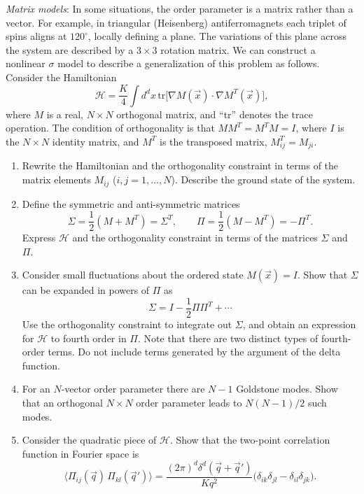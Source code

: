 \begin{problem}
    \textit{Matrix models}: In some situations, the order parameter is a matrix rather than a vector. For example, in triangular (Heisenberg) antiferromagnets each triplet of spins aligns at $120^\circ$, locally defining a plane. The variations of this plane across the system are described by a $3\times 3$ rotation matrix. We can construct a nonlinear $\sigma$ model to describe a generalization of this problem as follows. Consider the Hamiltonian
    \[
        \mathcal{H} = \frac{K}{4}\int d^dx\,\mathrm{tr}\bigl[\nabla M(\vec{x})\cdot\nabla M^T(\vec{x})\bigr],
    \]
    where $M$ is a real, $N\times N$ orthogonal matrix, and ``tr'' denotes the trace operation. The condition of orthogonality is that $MM^T = M^TM = I$, where $I$ is the $N\times N$ identity matrix, and $M^T$ is the transposed matrix, $M^T_{ij} = M_{ji}$.

    \begin{enumerate}
        \item[(a)] Rewrite the Hamiltonian and the orthogonality constraint in terms of the matrix elements $M_{ij}$ ($i,j = 1, \ldots, N$). Describe the ground state of the system.

        \item[(b)] Define the symmetric and anti-symmetric matrices
        \[
            \Sigma = \frac{1}{2}(M + M^T) = \Sigma^T, \qquad \Pi = \frac{1}{2}(M - M^T) = -\Pi^T.
        \]
        Express $\mathcal{H}$ and the orthogonality constraint in terms of the matrices $\Sigma$ and $\Pi$.

        \item[(c)] Consider small fluctuations about the ordered state $M(\vec{x}) = I$. Show that $\Sigma$ can be expanded in powers of $\Pi$ as
        \[
            \Sigma = I - \frac{1}{2}\Pi\Pi^T + \cdots
        \]
        Use the orthogonality constraint to integrate out $\Sigma$, and obtain an expression for $\mathcal{H}$ to fourth order in $\Pi$. Note that there are two distinct types of fourth-order terms. Do not include terms generated by the argument of the delta function.

        \item[(d)] For an $N$-vector order parameter there are $N - 1$ Goldstone modes. Show that an orthogonal $N\times N$ order parameter leads to $N(N-1)/2$ such modes.

        \item[(e)] Consider the quadratic piece of $\mathcal{H}$. Show that the two-point correlation function in Fourier space is
        \[
            \langle\Pi_{ij}(\vec{q})\,\Pi_{kl}(\vec{q}')\rangle = \frac{(2\pi)^d\delta^d(\vec{q}+\vec{q}')}{Kq^2}\bigl(\delta_{ik}\delta_{jl} - \delta_{il}\delta_{jk}\bigr).
        \]


\end{enumerate}
\end{problem}

